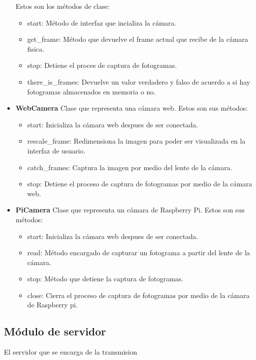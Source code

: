 \begin{itemize}
\begin{itemize}
        \end{itemize}
        Estos son los métodos de clase:
        \begin{itemize}
            \item start: Método de interfaz que incializa la cámara.
            \item get\_frame: Método que devuelve el frame actual que recibe de la cámara fisica.
            \item stop: Detiene el proces de captura de fotogramas.
            \item there\_is\_frames: Devuelve un valor verdadero y falso de acuerdo a si hay fotogramas almacenados en memoria o no.
        \end{itemize}
    \item \textbf{WebCamera} Clase que representa una cámara web. Estos son sus métodos:
        \begin{itemize}
            \item start: Inicializa la cámara web despues de ser conectada.
            \item rescale\_frame: Redimensiona la imagen para poder ser visualizada en la interfaz de usuario.
            \item catch\_frames: Captura la imagen por medio del lente de la cámara.
            \item stop: Detiene el proceso de captura de fotogramas por medio de la cámara web.
        \end{itemize}
    \item \textbf{PiCamera} Clase que representa un cámara de Raspberry Pi. Estos son sus métodos:
        \begin{itemize}
            \item start: Inicializa la cámara web despues de ser conectada.
            \item read: Método encargado de capturar un fotograma a partir del lente de la cámara.
            \item stop: Método que detiene la captura de fotogramas.
            \item close: Cierra el proceso de captura de fotogramas por medio de la cámara de Raspberry pi.
        \end{itemize}
\end{itemize}

\subsection{Módulo de servidor}
El servidor que se encarga de la transmision
